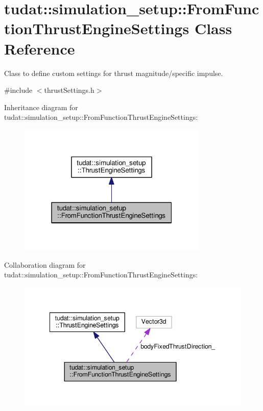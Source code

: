 \hypertarget{classtudat_1_1simulation__setup_1_1FromFunctionThrustEngineSettings}{}\section{tudat\+:\+:simulation\+\_\+setup\+:\+:From\+Function\+Thrust\+Engine\+Settings Class Reference}
\label{classtudat_1_1simulation__setup_1_1FromFunctionThrustEngineSettings}


Class to define custom settings for thrust magnitude/specific impulse.  




{\ttfamily \#include $<$thrust\+Settings.\+h$>$}



Inheritance diagram for tudat\+:\+:simulation\+\_\+setup\+:\+:From\+Function\+Thrust\+Engine\+Settings\+:
\nopagebreak
\begin{figure}[H]
\begin{center}
\leavevmode
\includegraphics[width=256pt]{classtudat_1_1simulation__setup_1_1FromFunctionThrustEngineSettings__inherit__graph}
\end{center}
\end{figure}


Collaboration diagram for tudat\+:\+:simulation\+\_\+setup\+:\+:From\+Function\+Thrust\+Engine\+Settings\+:
\nopagebreak
\begin{figure}[H]
\begin{center}
\leavevmode
\includegraphics[width=341pt]{classtudat_1_1simulation__setup_1_1FromFunctionThrustEngineSettings__coll__graph}
\end{center}
\end{figure}
